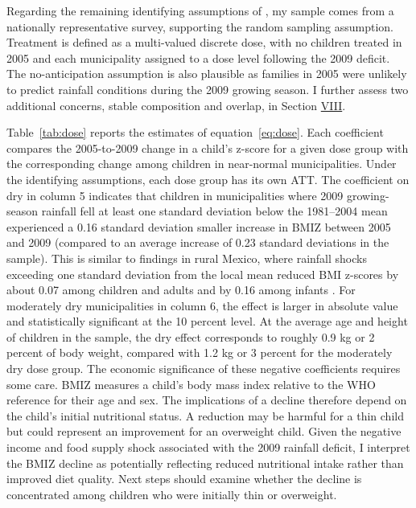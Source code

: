 Regarding the remaining identifying assumptions of \textcite{callawayDifferenceinDifferencesContinuousTreatment2024}, my sample comes from a nationally representative survey, supporting the random sampling assumption. Treatment is defined as a multi-valued discrete dose, with no children treated in 2005 and each municipality assigned to a dose level following the 2009 deficit. The no-anticipation assumption is also plausible as families in 2005 were unlikely to predict rainfall conditions during the 2009 growing season. I further assess two additional concerns, stable composition and overlap, in Section \hyperref[sec:VIII]{VIII}.


Table~\ref{tab:dose} reports the estimates of equation~\eqref{eq:dose}. Each coefficient compares the 2005-to-2009 change in a child's z-score for a given dose group with the corresponding change among children in near-normal municipalities. Under the identifying assumptions, each dose group has its own ATT. The coefficient on dry in column 5 indicates that children in municipalities where 2009 growing-season rainfall fell at least one standard deviation below the 1981--2004 mean experienced a 0.16 standard deviation smaller increase in BMIZ between 2005 and 2009 (compared to an average increase of 0.23 standard deviations in the sample). This is similar to findings in rural Mexico, where rainfall shocks exceeding one standard deviation from the local mean reduced BMI z-scores by about 0.07 among children and adults and by 0.16 among infants \parencite{adhvaryuHelpingChildrenCatch2024}. For moderately dry municipalities in column 6, the effect is larger in absolute value and statistically significant at the 10 percent level. At the average age and height of children in the sample, the dry effect corresponds to roughly 0.9 kg or 2 percent of body weight, compared with 1.2 kg or 3 percent for the moderately dry dose group. The economic significance of these negative coefficients requires some care. BMIZ measures a child's body mass index relative to the WHO reference for their age and sex. The implications of a decline therefore depend on the child's initial nutritional status. A reduction may be harmful for a thin child but could represent an improvement for an overweight child. Given the negative income and food supply shock associated with the 2009 rainfall deficit, I interpret the BMIZ decline as potentially reflecting reduced nutritional intake rather than improved diet quality. Next steps should examine whether the decline is concentrated among children who were initially thin or overweight.

